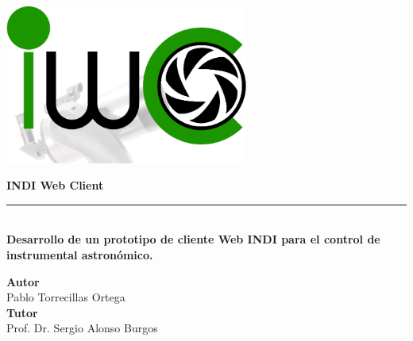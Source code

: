 \begin{titlepage}


\setlength{\centeroffset}{-0.5\oddsidemargin}
\addtolength{\centeroffset}{0.5\evensidemargin}
\thispagestyle{empty}

\noindent\hspace*{\centeroffset}\begin{minipage}{\textwidth}

\centering

%

 \vspace{3.3cm}

\includegraphics[width=0.6\textwidth]{imagenes/IWC}
 \vspace{0.3cm}


{\Huge\bfseries INDI Web Client\\
}
\noindent\rule[-1ex]{\textwidth}{3pt}\\[3.5ex]
{\large\bfseries Desarrollo de un prototipo de cliente Web INDI para el control de instrumental astronómico.\\[4cm]}
\end{minipage}

\vspace{2.5cm}
\noindent\hspace*{\centeroffset}\begin{minipage}{\textwidth}
\centering

\textbf{Autor}\\ {Pablo Torrecillas Ortega}\\[2.5ex]
\textbf{Tutor}\\
{Prof. Dr. Sergio Alonso Burgos}\\[2cm]
\end{minipage}


\end{titlepage}
